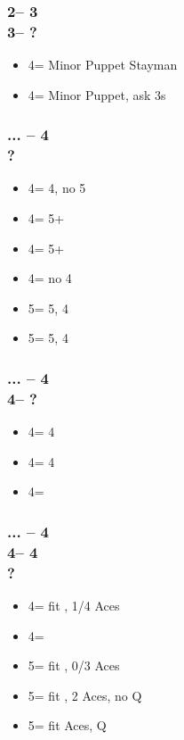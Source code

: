 \documentclass[12pt, a4paper]{report}
\begin{document}
{    \subsubsection*{2\nt -- 3\hearts\\
                    3\spades -- ?}
    \begin{itemize}
        \item 4\clubs = Minor Puppet Stayman
        \item 4\diams = Minor Puppet, ask 3s
    \end{itemize}

    \subsubsection*{... -- 4\clubs\\
                    ?}
    \begin{itemize}
        \item 4\diams = 4\minor, no 5\minor
        \item 4\hearts = 5+\clubs
        \item 4\spades = 5+\diams
        \item 4\nt = no 4\minor
        \item 5\clubs = 5\clubs, 4\diams
        \item 5\diams = 5\diams, 4\clubs
    \end{itemize}

    \subsubsection*{... -- 4\clubs\\
                    4\diams -- ?}
    \begin{itemize}
        \item 4\hearts = 4\clubs
        \item 4\spades = 4\diams
        \item 4\nt = \soff
    \end{itemize}

    \subsubsection*{... -- 4\clubs\\
                    4\diams -- 4\hearts\\
                    ?}
    \begin{itemize}
        \item 4\spades = fit \clubs, 1/4 Aces
        \item 4\nt = \soff
        \item 5\clubs = fit \clubs, 0/3 Aces
        \item 5\diams = fit \clubs, 2 Aces, no Q\clubs
        \item 5\hearts = fit  Aces, Q\clubs
    \end{itemize}

}
\end{document}
